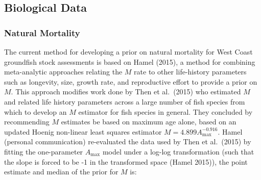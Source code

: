 \documentclass[11pt,
  english,
  a4paper,
]{article}
\begin{document}
\leavevmode\tagmcend\tagstructend\par


\hypertarget{bio-data}{%
\subsection{Biological Data}\label{bio-data}}

\leavevmode\tagmcend\tagstructend


\hypertarget{natural-mortality}{%
\subsubsection{Natural Mortality}\label{natural-mortality}}

\leavevmode\tagmcend\tagstructend


The current method for developing a prior on natural mortality for West Coast groundfish stock assessments is based on Hamel {(2015)\leavevmode\tagmcend\tagstructend}, a method for combining meta-analytic approaches relating the {\(M\)\leavevmode\tagmcend\tagstructend} rate to other life-history parameters such as longevity, size, growth rate, and reproductive effort to provide a prior on {\(M\)\leavevmode\tagmcend\tagstructend}. This approach modifies work done by Then et al.~{(2015)\leavevmode\tagmcend\tagstructend} who estimated {\(M\)\leavevmode\tagmcend\tagstructend} and related life history parameters across a large number of fish species from which to develop an {\(M\)\leavevmode\tagmcend\tagstructend} estimator for fish species in general. They concluded by recommending {\(M\)\leavevmode\tagmcend\tagstructend} estimates be based on maximum age alone, based on an updated Hoenig non-linear least squares estimator {\(M = 4.899A^{-0.916}_{\text{max}}\)\leavevmode\tagmcend\tagstructend}. Hamel (personal communication) re-evaluated the data used by Then et al.~{(2015)\leavevmode\tagmcend\tagstructend} by fitting the one-parameter {\(A_{\text{max}}\)\leavevmode\tagmcend\tagstructend} model under a log-log transformation (such that the slope is forced to be -1 in the transformed space {(Hamel 2015)\leavevmode\tagmcend\tagstructend}), the point estimate and median of the prior for {\(M\)\leavevmode\tagmcend\tagstructend} is:
\end{document}
